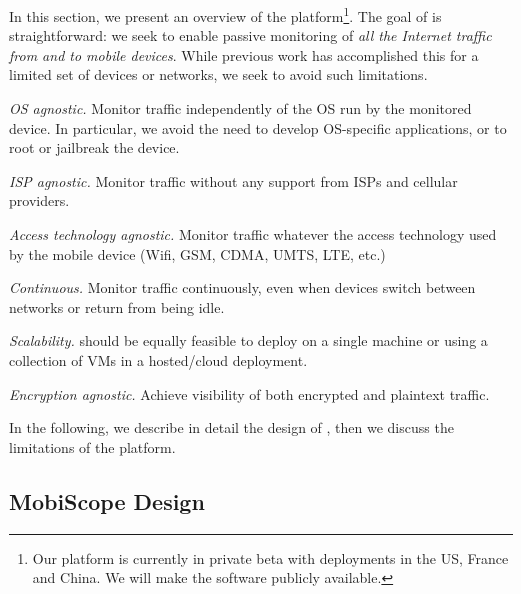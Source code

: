 In this section, we present an overview of the \platname{} platform\footnote{Our platform is currently in private beta with deployments in the US, France and China. We will make the \platname{} software publicly available.}. The goal of \platname{} is straightforward: we 
 seek to enable passive monitoring of \emph{all
  the Internet traffic from and to mobile devices}. While previous work has accomplished 
  this for a limited set of devices or networks, we seek to avoid such limitations. 
\begin{packedenumerate}
\item \emph{OS agnostic.} Monitor traffic independently of
  the OS run by the monitored device. In particular, we avoid the need to 
  develop OS-specific applications, or to root or jailbreak the device.
\item \emph{ISP agnostic.} Monitor traffic without any
  support from ISPs and cellular providers.
\item \emph{Access technology agnostic.} Monitor traffic
  whatever the access technology used by the mobile device (Wifi, GSM,
  CDMA, UMTS, LTE, etc.)
\item \emph{Continuous.} Monitor traffic continuously, even when devices switch 
between networks or return from being idle.

\item \emph{Scalability.} \platname{} should be equally feasible to deploy 
on a single machine or using a collection of VMs in a hosted/cloud deployment. 

\item \emph{Encryption agnostic.} Achieve visibility of both encrypted and plaintext traffic.

 \end{packedenumerate}    
 

In the following, we describe in detail the design of \platname{},
then we discuss the limitations of the platform.


\subsection{MobiScope Design}


